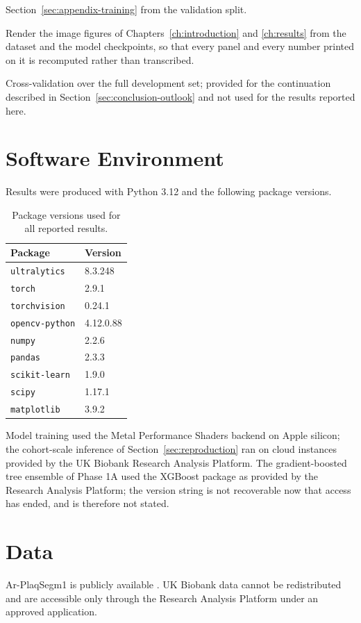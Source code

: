 \begin{description}[leftmargin=2.8cm,style=nextline,nosep,itemsep=3pt]
        Section~\ref{sec:appendix-training} from the validation split.
  \item[\texttt{make\_qualitative\_figure.py},\\\texttt{make\_echogenicity\_figure.py}]
        Render the image figures of Chapters~\ref{ch:introduction} and \ref{ch:results} from the
        dataset and the model checkpoints, so that every panel and every number printed on it is
        recomputed rather than transcribed.
  \item[\texttt{run\_cv.py}] Cross-validation over the full development set; provided for the
        continuation described in Section~\ref{sec:conclusion-outlook} and not used for the
        results reported here.
\end{description}

\section*{Software Environment}

Results were produced with Python 3.12 and the following package versions.

\begin{table}[H]
\centering
\caption[Software versions]{Package versions used for all reported results.}
\label{tab:software}
\begin{tabular}{ll}
\hline
Package & Version \\
\hline
\texttt{ultralytics} \cite{jocher2023ultralytics} & 8.3.248 \\
\texttt{torch} & 2.9.1 \\
\texttt{torchvision} & 0.24.1 \\
\texttt{opencv-python} & 4.12.0.88 \\
\texttt{numpy} & 2.2.6 \\
\texttt{pandas} & 2.3.3 \\
\texttt{scikit-learn} & 1.9.0 \\
\texttt{scipy} & 1.17.1 \\
\texttt{matplotlib} & 3.9.2 \\
\hline
\end{tabular}
\end{table}

Model training used the Metal Performance Shaders backend on Apple silicon; the cohort-scale
inference of Section~\ref{sec:reproduction} ran on cloud instances provided by the UK Biobank
Research Analysis Platform.
The gradient-boosted tree ensemble of Phase 1A used the XGBoost package as provided by the
Research Analysis Platform; the version string is not recoverable now that access has ended, and
is therefore not stated.

\section*{Data}

Ar-PlaqSegm1 is publicly available \cite{rulloni2025arplaqsegm1}. UK Biobank data cannot be
redistributed and are accessible only through the Research Analysis Platform under an approved
application.
